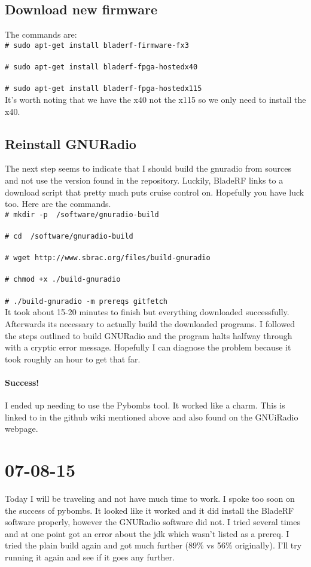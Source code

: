 \documentclass{article}
\newcommand{\shellcmd}[1]{\\\indent\indent\texttt{\footnotesize\# #1}\\}
\begin{document}
	\subsection{Download new firmware}
	The commands are:
	\shellcmd{sudo apt-get install bladerf-firmware-fx3}
	\shellcmd{sudo apt-get install bladerf-fpga-hostedx40}
	\shellcmd{sudo apt-get install bladerf-fpga-hostedx115} 
	It's worth noting that we have the x40 not the x115 so we only need to install the x40. 
	\subsection{Reinstall GNURadio}
	The next step seems to indicate that
	I should build the gnuradio from sources and not use the version found in the repository. Luckily, BladeRF links to a 
	download script that pretty much puts cruise control on. Hopefully you have luck too. Here are the commands. 
	\shellcmd{mkdir -p ~/software/gnuradio-build}
	\shellcmd{cd ~/software/gnuradio-build}
	\shellcmd{wget http://www.sbrac.org/files/build-gnuradio}
	\shellcmd{chmod +x ./build-gnuradio}
	\shellcmd{./build-gnuradio -m prereqs gitfetch}

	It took about 15-20 minutes to finish but everything downloaded successfully. Afterwards its necessary to actually build
	the downloaded programs. I followed the steps outlined to build GNURadio and the program halts halfway through with a 
	cryptic error message. Hopefully I can diagnose the problem because it took roughly an hour to get that far.  
	 	
	\paragraph{Success!} I ended up needing to use the Pybombs tool. It worked like a charm. This is linked to in the github
	wiki mentioned above and also found on the GNUiRadio webpage.

	\newpage
	\section{07-08-15}
	Today I will be traveling and not have much time to work. I spoke too soon on the success of pybombs. It looked like it
	worked and it did install the BladeRF software properly, however the GNURadio software did not. I tried several times
	and at one point got an error about the jdk which wasn't listed as a prereq. I tried the plain build again and got much
	further (89\% vs 56\% originally). I'll try running it again and see if it goes any further. 
\end{document}
